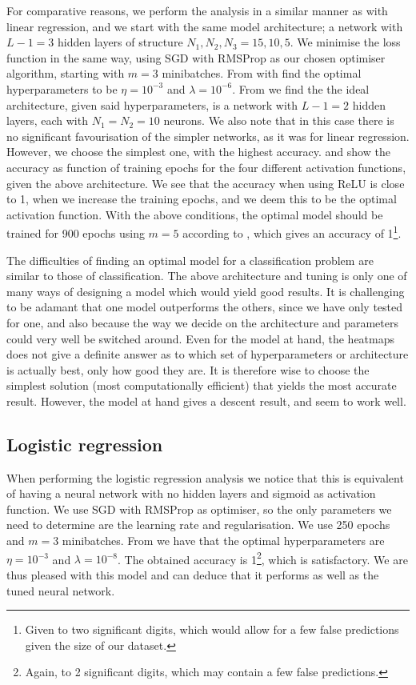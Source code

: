     For comparative reasons, we perform the analysis in a similar manner as with linear regression, and we start with the same model architecture; a network with $L-1=3$ hidden layers of structure $N_1,N_2,N_3=15, 10, 5$. We minimise the loss function in the same way, using SGD with RMSProp as our chosen optimiser algorithm, starting with $m=3$ minibatches. From  with find the optimal hyperparameters to be $\eta=10^{-3}$ and $\lambda=10^{-6}$. From  we find the the ideal architecture, given said hyperparameters, is a network with $L-1=2$ hidden layers, each with $N_1=N_2=10$ neurons. We also note that in this case there is no significant favourisation of the simpler networks, as it was for linear regression. However, we choose the simplest one, with the highest accuracy.  and  show the accuracy as function of training epochs for the four different activation functions, given the above architecture. We see that the accuracy when using ReLU is close to 1, when we increase the training epochs, and we deem this to be the optimal activation function. With the above conditions, the optimal model should be trained for 900 epochs using $m=5$ according to , which gives an accuracy of 1\footnote{Given to two significant digits, which would allow for a few false predictions given the size of our dataset.}.

    The difficulties of finding an optimal model for a classification problem are similar to those of classification. The above architecture and tuning is only one of many ways of designing a model which would yield good results. It is challenging to be adamant that one model outperforms the others, since we have only tested for one, and also because the way we decide on the architecture and parameters could very well be switched around. Even for the model at hand, the heatmaps does not give a definite answer as to which set of hyperparameters or architecture is actually best, only how good they are. It is therefore wise to choose the simplest solution (most computationally efficient) that yields the most accurate result. However, the model at hand gives a descent result, and seem to work well.

\subsection{Logistic regression}\label{sec:analysis_logistic_regression}
    When performing the logistic regression analysis we notice that this is equivalent of having a neural network with no hidden layers and sigmoid as activation function. We use SGD with RMSProp as optimiser, so the only parameters we need to determine are the learning rate and regularisation. We use 250 epochs and $m=3$ minibatches. From  we have that the optimal hyperparameters are $\eta=10^{-3}$ and $\lambda = 10^{-8}$. The obtained accuracy is 1\footnote{Again, to 2 significant digits, which may contain a few false predictions.}, which is satisfactory. We are thus pleased with this model and can deduce that it performs as well as the tuned neural network. 

